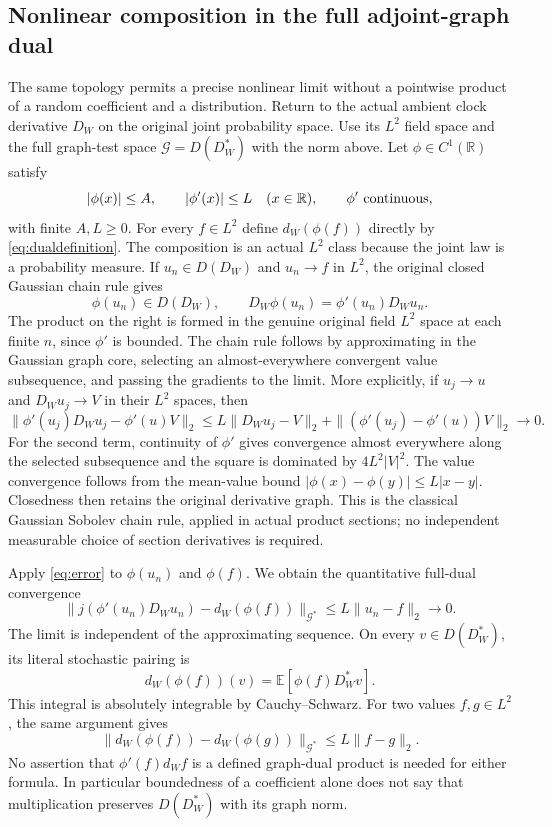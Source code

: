 \documentclass[11pt]{article}
\newcommand{\R}{\mathbb R}\newcommand{\E}{\mathbb E}
\begin{document}
\subsection*{Nonlinear composition in the full adjoint-graph dual}
The same topology permits a precise nonlinear limit without a
pointwise product of a random coefficient and a distribution.
Return to the actual ambient clock derivative $D_W$ on the original
joint probability space. Use its $L^2$ field space and the full
graph-test space $\mathcal G=D(D_W^*)$ with the norm above.
Let $\phi\in C^1(\R)$ satisfy
\[
 |\phi(x)|\leq A,\qquad |\phi'(x)|\leq L\quad(x\in\R),
 \qquad \phi'\ \hbox{continuous},
\]
with finite $A,L\geq0$. For every $f\in L^2$ define
$d_W(\phi(f))$ directly by \eqref{eq:dualdefinition}.
The composition is an actual $L^2$ class because the joint law is
a probability measure. If $u_n\in D(D_W)$ and $u_n\to f$ in
$L^2$, the original closed Gaussian chain rule gives
\[
 \phi(u_n)\in D(D_W),\qquad
 D_W\phi(u_n)=\phi'(u_n)D_Wu_n.
\]
The product on the right is formed in the genuine original
field $L^2$ space at each finite $n$, since $\phi'$ is bounded.
The chain rule follows by approximating in the Gaussian graph
core, selecting an almost-everywhere convergent value subsequence,
and passing the gradients to the limit. More explicitly, if
$u_j\to u$ and $D_Wu_j\to V$ in their $L^2$ spaces, then
\[
 \|\phi'(u_j)D_Wu_j-\phi'(u)V\|_2
 \leq L\|D_Wu_j-V\|_2
       +\|(\phi'(u_j)-\phi'(u))V\|_2\longrightarrow0.
\]
For the second term, continuity of $\phi'$ gives convergence
almost everywhere along the selected subsequence and the square
is dominated by $4L^2|V|^2$. The value convergence follows from
the mean-value bound $|\phi(x)-\phi(y)|\leq L|x-y|$.
Closedness then retains the original derivative graph. This is
the classical Gaussian Sobolev chain rule, applied in actual
product sections; no independent measurable choice of section
derivatives is required.

Apply \eqref{eq:error} to $\phi(u_n)$ and $\phi(f)$. We obtain the
quantitative full-dual convergence
\begin{equation}\label{eq:weaknonlinear}
 \|j(\phi'(u_n)D_Wu_n)-d_W(\phi(f))\|_{\mathcal G^*}
 \leq L\|u_n-f\|_2\longrightarrow0.
\end{equation}
The limit is independent of the approximating sequence. On every
$v\in D(D_W^*)$, its literal stochastic pairing is
\[
 d_W(\phi(f))(v)=\E[\phi(f)D_W^*v].
\]
This integral is absolutely integrable by Cauchy--Schwarz.
For two values $f,g\in L^2$, the same argument gives
\[
 \|d_W(\phi(f))-d_W(\phi(g))\|_{\mathcal G^*}
                  \leq L\|f-g\|_2.
\]
No assertion that $\phi'(f)d_Wf$ is a defined graph-dual product
is needed for either formula. In particular boundedness of a
coefficient alone does not say that multiplication preserves
$D(D_W^*)$ with its graph norm.
\end{document}
